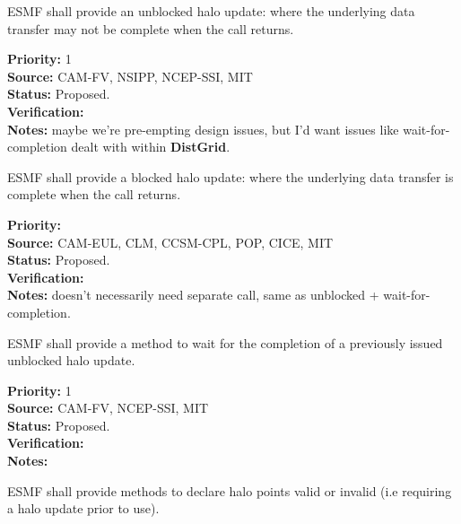  \label{DG:halo}



ESMF shall provide an unblocked halo update: where the underlying
data transfer may not be complete when the call returns.

\begin{reqlist}
{\bf Priority:} 1 \\ 
{\bf Source:} CAM-FV, NSIPP, NCEP-SSI, MIT \\
{\bf Status:} Proposed. \\
{\bf Verification:} \\
{\bf Notes:} maybe we're pre-empting design issues, but I'd want
  issues like wait-for-completion dealt with within \textbf{DistGrid}.
\end{reqlist}


ESMF shall provide a blocked halo update: where the underlying
data transfer is complete when the call returns.

\begin{reqlist}
{\bf Priority:} \\
{\bf Source:} CAM-EUL, CLM, CCSM-CPL, POP, CICE, MIT \\
{\bf Status:} Proposed. \\
{\bf Verification:} \\
{\bf Notes:} doesn't necessarily need separate call, same as unblocked
  + wait-for-completion.
\end{reqlist}


ESMF shall provide a method to wait for the completion of a previously
issued unblocked halo update.

\begin{reqlist}
{\bf Priority:} 1 \\ 
{\bf Source:} CAM-FV, NCEP-SSI, MIT \\
{\bf Status:} Proposed. \\
{\bf Verification:} \\
{\bf Notes:}
\end{reqlist}


ESMF shall provide methods to declare halo points valid or invalid
(i.e requiring a halo update prior to use).

